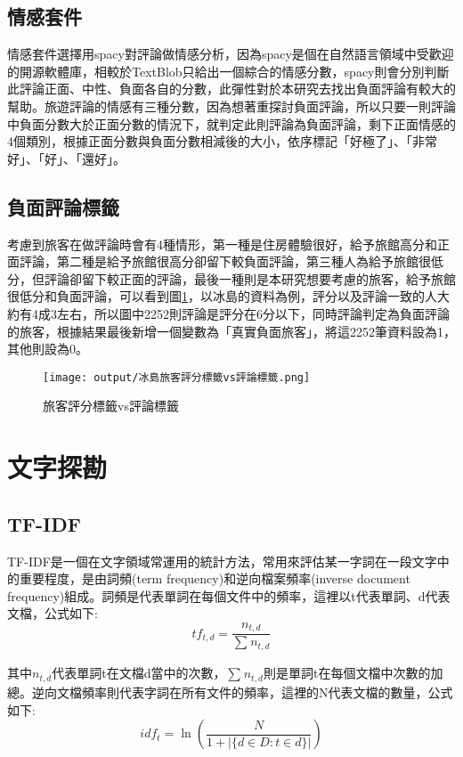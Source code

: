 \subsection{情感套件}

	情感套件選擇用spacy對評論做情感分析，因為spacy是個在自然語言領域中受歡迎的開源軟體庫，相較於TextBlob只給出一個綜合的情感分數，spacy則會分別判斷此評論正面、中性、負面各自的分數，此彈性對於本研究去找出負面評論有較大的幫助。旅遊評論的情感有三種分數，因為想著重探討負面評論，所以只要一則評論中負面分數大於正面分數的情況下，就判定此則評論為負面評論，剩下正面情感的4個類別，根據正面分數與負面分數相減後的大小，依序標記「好極了」、「非常好」、「好」、「還好」。	
	
\newpage

\subsection{負面評論標籤}

	考慮到旅客在做評論時會有4種情形，第一種是住房體驗很好，給予旅館高分和正面評論，第二種是給予旅館很高分卻留下較負面評論，第三種人為給予旅館很低分，但評論卻留下較正面的評論，最後一種則是本研究想要考慮的旅客，給予旅館很低分和負面評論，可以看到圖\ref{Fi3g7}，以冰島的資料為例，評分以及評論一致的人大約有4成3左右，所以圖中2252則評論是評分在6分以下，同時評論判定為負面評論的旅客，根據結果最後新增一個變數為「真實負面旅客」，將這2252筆資料設為1，其他則設為0。
	
	\begin{figure}[H]
	\centering
	\texttt{[image: output/冰島旅客評分標籤vs評論標籤.png]}
	\caption{旅客評分標籤vs評論標籤}
	\label{Fi3g7}
	\end{figure}
	
\newpage


\section{文字探勘}

\subsection{TF-IDF}

	TF-IDF是一個在文字領域常運用的統計方法，常用來評估某一字詞在一段文字中的重要程度，是由詞頻(term frequency)和逆向檔案頻率(inverse document frequency)組成。詞頻是代表單詞在每個文件中的頻率，這裡以t代表單詞、d代表文檔，公式如下:
$$tf_{t,d} = \dfrac{n_{t,d}}{\sum^{}_{}n_{t,d}}$$

\noindent 其中$n_{t,d}$代表單詞t在文檔d當中的次數，$\sum^{}_{}n_{t,d}$則是單詞t在每個文檔中次數的加總。逆向文檔頻率則代表字詞在所有文件的頻率，這裡的N代表文檔的數量，公式如下:
$$idf_t = \ln\left(\dfrac{N}{1+|\{d\in D:t\in d\}|}\right)$$


